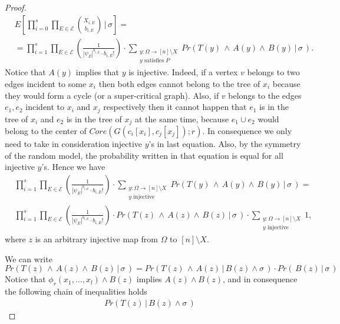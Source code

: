 \documentclass[11pt,notitlepage]{report}
\theoremstyle{definition}
\begin{document}
\begin{proof}
	\begin{align} \nonumber
		& E\left[\prod_{i=0}^{s}\prod_{E\in \mathcal{E}}
		\binom{X_{i,E}}{b_{i,E}} \, \bigg|\, \sigma \right]= \\
		&=\prod_{i=1}^{s}
		\prod_{E\in \mathcal{E}} \left(\frac{1}{|\psi_E|^{b_{i,E}} \cdot b_{i,E}!}\right) \cdot
		\sum_{\substack{y:\Omega \rightarrow [n]\setminus X\\ 
		y \text{ satisfies } P}} 
		Pr( T(y) \, \wedge \, A(y) \wedge \, B(y) \, | \, \sigma \, ).		
	\end{align} 
	Notice that $A(y)$ implies that $y$ is injective. Indeed, if a vertex
	$v$ belongs to two edges incident to some $x_i$ then both edges cannot
	belong to the tree of $x_i$ because they would form a cycle (or a super-critical graph). Also, if $v$ belongs to the edges $e_1, e_2$
	incident to $x_i$ and $x_j$ respectively then it cannot happen that
	$e_1$ is in the tree of $x_i$ and $e_2$ is in the tree of $x_j$ at the
	same time, because $e_1\cup e_2$ would belong to the center of 
	$Core(G(c_i[x_i],c_j[x_j]);r)$.
	In consequence we only need to take in consideration injective $y$'s in 
	last equation. Also, by the symmetry of the random model, the probability
	written in that equation is equal for all injective $y$'s. 
	Hence we have
	\begin{align} \nonumber
		& \prod_{i=1}^{s}
		\prod_{E\in \mathcal{E}} \left(\frac{1}{|\psi_E|^{b_{i,E}} \cdot b_{i,E}!}\right) \cdot
		\sum_{\substack{y:\Omega \rightarrow [n]\setminus X\\ y \text{ injective}}} 
		Pr( T(y) \, \wedge \, A(y) \wedge \, B(y) \, | \, \sigma \, )=\\
		& \label{eqn:distributed}
		\prod_{i=1}^{s}
		\prod_{E\in \mathcal{E}} \left(\frac{1}{|\psi_E|^{b_{i,E}} \cdot b_{i,E}!}\right) \cdot
		Pr( T(z) \, \wedge \, A(z) \wedge \, B(z) \, | \, \sigma \, )
		\cdot \sum_{\substack{y:\Omega \rightarrow [n]\setminus X\\ y \text{ injective}}} 1,
	\end{align} 
   	where $z$ is an arbitrary injective map from $\Omega$ to
   	$[n]\setminus X$. \par
	We can write
	\[Pr( T(z) \, \wedge \, A(z) \wedge \, B(z) \, | \, \sigma \, )=
	Pr( T(z) \, \wedge \, A(z) \, | \, B(z) \wedge \sigma \, )
	\cdot Pr( \, B(z) \, | \, \sigma \, )\]
	Notice that $\phi_r(x_1,\dots, x_l)\wedge B(z)$ implies $A(z)\wedge
	B(z)$,	and in consequence the following chain of inequalities holds
	\begin{align*} 
	Pr( T(z)  \, | \, B(z) \wedge \sigma \, ) &

\end{align*}
\end{proof}
\end{document}
